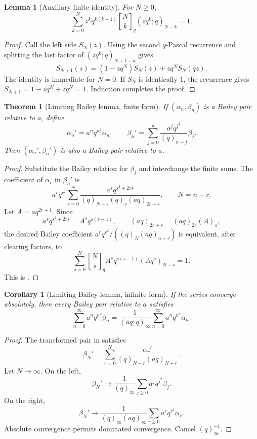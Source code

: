 \documentclass[11pt,oneside,openany]{book}
\newtheorem{theorem}{Theorem}[chapter]
\newtheorem{lemma}[lemma]{Lemma}
\newtheorem{corollary}[corollary]{Corollary}
\theoremstyle{definition}
\theoremstyle{remark}
\newcommand{\qbinom}[2]{\genfrac{[}{]}{0pt}{}{#1}{#2}_{q}}
\begin{document}
\begin{lemma}[Auxiliary finite identity]\label{lem:bailey-aux}
For $N\ge0$,
\[
 \sum_{k=0}^{N}z^kq^{k(k-1)}\qbinom Nk
 (zq^k;q)_{N-k}=1.
\]
\end{lemma}

\begin{proof}
Call the left side $S_N(z)$.  Using the second $q$-Pascal recurrence and splitting the last factor of $(zq^k;q)_{N+1-k}$ gives
\[
 S_{N+1}(z)=(1-zq^N)S_N(z)+zq^NS_N(qz).
\]
The identity is immediate for $N=0$.  If $S_N$ is identically $1$, the recurrence gives $S_{N+1}=1-zq^N+zq^N=1$.  Induction completes the proof.
\end{proof}

\begin{theorem}[Limiting Bailey lemma, finite form]\label{thm:bailey-limit-finite}
If $(\alpha_n,\beta_n)$ is a Bailey pair relative to $a$, define
\[
 \alpha_n'=a^nq^{n^2}\alpha_n,
 \qquad
 \beta_n'=\sum_{j=0}^{n}\frac{a^jq^{j^2}}{(q)_{n-j}}\beta_j.
\]
Then $(\alpha_n',\beta_n')$ is also a Bailey pair relative to $a$.
\end{theorem}

\begin{proof}
Substitute the Bailey relation for $\beta_j$ and interchange the finite sums.  The coefficient of $\alpha_r$ in $\beta_n'$ is
\[
 a^rq^{r^2}\sum_{s=0}^{N}
 \frac{a^sq^{s^2+2rs}}
 {(q)_{N-s}(q)_s(aq)_{2r+s}},
 \qquad N=n-r.
\]
Let $A=aq^{2r+1}$.  Since
\[
 a^sq^{s^2+2rs}=A^sq^{s(s-1)},
 \qquad
 (aq)_{2r+s}=(aq)_{2r}(A)_s,
\]
the desired Bailey coefficient
\(
 a^rq^{r^2}/((q)_N(aq)_{n+r})
\)
is equivalent, after clearing factors, to
\[
 \sum_{s=0}^{N}\qbinom Ns A^sq^{s(s-1)}(Aq^s)_{N-s}=1.
\]
This is .
\end{proof}

\begin{corollary}[Limiting Bailey lemma, infinite form]\label{cor:bailey-limit-infinite}
If the series converge absolutely, then every Bailey pair relative to $a$ satisfies
\[
 \sum_{n=0}^{\infty}a^nq^{n^2}\beta_n
 =\frac1{(aq;q)_\infty}
 \sum_{n=0}^{\infty}a^nq^{n^2}\alpha_n.
\]
\end{corollary}

\begin{proof}
The transformed pair in  satisfies
\[
 \beta_N'=\sum_{r=0}^{N}
 \frac{\alpha_r'}{(q)_{N-r}(aq)_{N+r}}.
\]
Let $N\to\infty$.  On the left,
\[
 \beta_N'\longrightarrow\frac1{(q)_\infty}
 \sum_{j\ge0}a^jq^{j^2}\beta_j.
\]
On the right,
\[
 \beta_N'\longrightarrow
 \frac1{(q)_\infty(aq)_\infty}
 \sum_{r\ge0}a^rq^{r^2}\alpha_r.
\]
Absolute convergence permits dominated convergence.  Cancel $(q)_\infty^{-1}$.
\end{proof}
\end{document}
